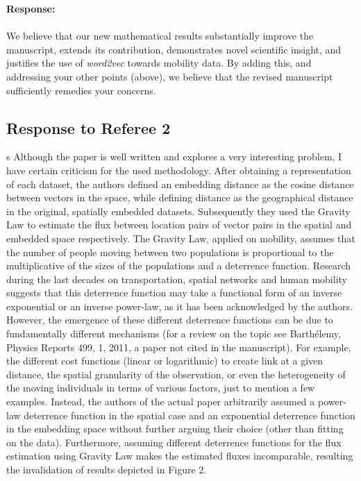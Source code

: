 \documentclass[12pt,draft,a4paper]{article}
\newcounter{comment}[subsection]
\newcommand{\response}[1]{{\noindent \textbf{Response:} \\ \\ \noindent #1}}
\newcommand{\rcomment}[1]{%
\vspace{10pt}
\begin{sectionbox}
s #1
\end{sectionbox}
}
\begin{document}
\response{We believe that our new mathematical results substantially improve the manuscript, extends its contribution, demonstrates novel scientific insight, and justifies the use of \textit{word2vec} towards mobility data. By adding this, and addressing your other points (above), we believe that the revised manuscript sufficiently remedies your concerns.

}



%
%
\clearpage
\setcounter{section}{3}
\subsection{Response to Referee 2}
\setcounter{section}{2}


\rcomment{%
	Although the paper is well written and explores a very interesting problem, I have certain criticism for the used methodology. After obtaining a representation of each dataset, the authors defined an embedding distance as the cosine distance between vectors in the space, while defining distance as the geographical distance in the original, spatially embedded datasets. Subsequently they used the Gravity Law to estimate the flux between location pairs of vector pairs in the spatial and embedded space respectively. The Gravity Law, applied on mobility, assumes that the number of people moving between two populations is proportional to the multiplicative of the sizes of the populations and a deterrence function. Research during the last decades on transportation, spatial networks and human mobility suggests that this deterrence function may take a functional form of an inverse exponential or an inverse power-law, as it has been acknowledged by the authors. However, the emergence of these different deterrence functions can be due to fundamentally different mechanisms (for a review on the topic see Barthélemy, Physics Reports 499, 1, 2011, a paper not cited in the manuscript). For example, the different cost functions (linear or logarithmic) to create link at a given distance, the spatial granularity of the observation, or even the heterogeneity of the moving individuals in terms of various factors, just to mention a few examples. Instead, the authors of the actual paper arbitrarily assumed a power-law deterrence function in the spatial case and an exponential deterrence function in the embedding space without further arguing their choice (other than fitting on the data). Furthermore, assuming different deterrence functions for the flux estimation using Gravity Law makes the estimated fluxes incomparable, resulting the invalidation of results depicted in Figure 2.
}
\end{document}
